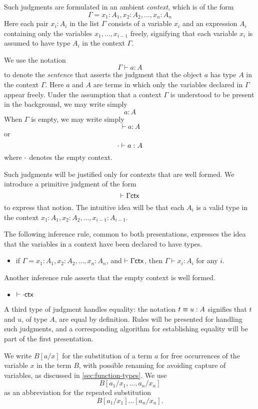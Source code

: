 Such judgments are formulated in an ambient {\em context}, which
is of the form
\[
  \Gamma =  x_1:A_1, x_2:A_2,\dots,x_n:A_n
\]
Here each pair $x_i:A_i$ in the list $\Gamma$ consists of a variable $x_i$ and
an expression $A_i$ containing only the variables $x_1,\dots,x_{i-1}$ freely,
signifying that each variable $x_i$ is assumed to have type $A_i$ in the
context $\Gamma$.

We use the notation
\[
  \Gamma \vdash a:A
\]
to denote the {\em sentence} that asserts the judgment that the object $a$ has
type $A$ in the context $\Gamma$.  Here $a$ and $A$ are terms in which only the
variables declared in $\Gamma$ appear freely.  Under the assumption that a
context $\Gamma$ is understood to be present in the background, we may write
simply
\[
  a:A
\]
When $\Gamma$ is empty, we may write simply
\[
  \vdash a:A
\]
or
\[
  \cdot \vdash a:A
\]
where $\cdot$ denotes the empty context.

Such judgments will be justified only for contexts that are well formed.  We
introduce a primitive judgment of the form
\[
  \vdash \Gamma \mathsf{ctx}
\]
to express that notion.  The intuitive idea will be that each $A_i$ is a valid
type in the context $x_1:A_1, x_2:A_2,\dots,x_{i-1}:A_{i-1}$.

The following inference rule, common to both presentations, expresses the idea
that the variables in a context have been declared to have types.
\begin{itemize}
\item if $\Gamma = x_1:A_1, x_2:A_2,\dots,x_n:A_n$, and $\vdash \Gamma \mathsf{ctx}$,
  then $\Gamma \vdash x_i : A_i$ for any $i$.
\end{itemize}

Another inference rule asserts that the empty context is well formed.
\begin{itemize}
\item $\vdash \cdot \mathsf{ctx}$
\end{itemize}

A third type of judgment handles equality: the notation $t \equiv u : A$
signifies that $t$ and $u$, of type $A$, are equal by definition.  Rules will
be presented for handling such judgments, and a corresponding algorithm for
establishing equality will be part of the first presentation.

We write $B[a/x]$ for the substitution of a term $a$ for free occurrences of
the variable $x$ in the term $B$, with possible renaming for avoiding capture
of variables, as discussed in \autoref{sec:function-types}.  We use
$$B[a_1/x_1,\dots,a_n/x_n]$$ as an abbreviation for the repeated substitution
$$B[a_1/x_1]\dots[a_n/x_n].$$

